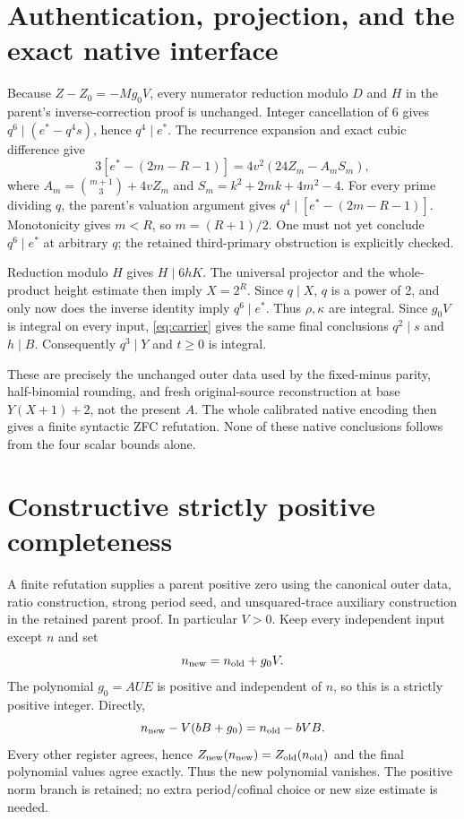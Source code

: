 \section{Authentication, projection, and the exact native interface}
Because $Z-Z_0=-Mg_0V$, every numerator reduction modulo $D$ and $H$
in the parent's inverse-correction proof is unchanged. Integer cancellation
of 6 gives $q^6\mid(e^*-q^4s)$, hence $q^4\mid e^*$.
The recurrence expansion and exact cubic difference give
\[
 3[e^*-(2m-R-1)]=4v^2(24Z_m-A_mS_m),
\]
where $A_m=\binom{m+1}{3}+4vZ_m$ and
$S_m=k^2+2mk+4m^2-4$. For every prime dividing $q$, the parent's
valuation argument gives $q^4\mid[e^*-(2m-R-1)]$.
Monotonicity gives $m<R$, so $m=(R+1)/2$. One must not yet conclude
$q^6\mid e^*$ at arbitrary $q$; the retained third-primary obstruction
is explicitly checked.

Reduction modulo $H$ gives $H\mid6hK$. The universal projector and the
whole-product height estimate then imply $X=2^R$. Since $q\mid X$,
$q$ is a power of 2, and only now does the inverse identity imply
$q^6\mid e^*$. Thus $\rho,\kappa$ are integral. Since $g_0V$ is
integral on every input, \eqref{eq:carrier} gives the same final conclusions
$q^2\mid s$ and $h\mid B$. Consequently $q^3\mid Y$ and $t\ge0$ is
integral.

These are precisely the unchanged outer data used by the fixed-minus
parity, half-binomial rounding, and fresh original-source reconstruction
at base $Y(X+1)+2$, not the present $A$. The whole calibrated native
encoding then gives a finite syntactic ZFC refutation. None of these
native conclusions follows from the four scalar bounds alone.

\section{Constructive strictly positive completeness}
A finite refutation supplies a parent positive zero using the canonical
outer data, ratio construction, strong period seed, and unsquared-trace
auxiliary construction in the retained parent proof. In particular $V>0$.
Keep every independent input except $n$ and set
\[
 n_{\rm new}=n_{\rm old}+g_0V.
\]
The polynomial $g_0=AUE$ is positive and independent of $n$, so this is
a strictly positive integer. Directly,
\[
 n_{\rm new}-V(bB+g_0)=n_{\rm old}-bVB.
\]
Every other register agrees, hence $Z_{\rm new}(n_{\rm new})=
Z_{\rm old}(n_{\rm old})$ and the final polynomial values agree exactly.
Thus the new polynomial vanishes. The positive norm branch is retained;
no extra period/cofinal choice or new size estimate is needed.

